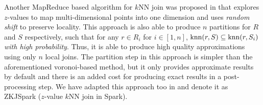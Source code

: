Another MapReduce based algorithm for $k$NN join was proposed in
\cite{feifeiknnj} that explores $z$-values to map multi-dimensional
points into one dimension and uses {\em random shift} to preserve
locality. This approach is also able to produce $n$ partitions for $R$
and $S$ respectively, such that for any $r\in R_i$ for $i\in [1, n]$,
$\operatorname{knn}(r, S)\subseteq \operatorname{knn}(r, S_i)$ {\em with high probability}. Thus,
it is able to produce high quality approximations using only $n$ local
joins. The partition step in this approach is simpler than the
aforementioned voronoi-based method, but it only provides approximate
results by default and there is an added cost for producing exact
results in a post-processing step. We have adapted this approach too
in \name and denote it as ZKJSpark ($z$-value $k$NN join in Spark).







